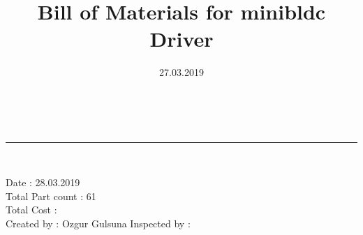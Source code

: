 \documentclass[12pt]{report}
\title{\LARGE Bill of Materials for mini\textunderscore bldc Driver}
\author{ \thedate}
\date{27.03.2019}
\makeatletter
\let\thetitle\@title
\makeatother
\begin{document}
\begin{titlepage}

	\begin{flushleft}

	{ \huge \bfseries \thetitle}\\
	\rule{\linewidth}{0.25 mm} \\[0.5cm]
	\begin{minipage}{0.8\textwidth}
		\begin{flushleft} \normalsize
			{Date : 28.03.2019\\}
             Total Part count : 61\\
             Total Cost :\\
             Created by : Ozgur Gulsuna \hfill Inspected by :
			\end{flushleft}
	\end{minipage}\\
	
	\end{flushleft}
	
	

  

\end{titlepage}
\end{document}
